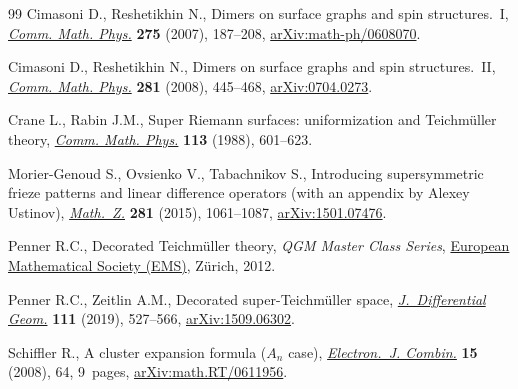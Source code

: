 \documentclass[11pt]{article}
\numberwithin{equation}{section}
\numberwithin{equation}{section}
\begin{document}
\begin{thebibliography}{99}
Cimasoni D., Reshetikhin N., Dimers on surface graphs and spin structures.~{I},
 \href{https://doi.org/10.1007/s00220-007-0302-7}{\textit{Comm. Math. Phys.}} \textbf{275} (2007), 187--208,
 \href{https://arxiv.org/abs/math-ph/0608070}{arXiv:math-ph/0608070}.

Cimasoni D., Reshetikhin N., Dimers on surface graphs and spin
 structures.~{II}, \href{https://doi.org/10.1007/s00220-008-0488-3}{\textit{Comm. Math. Phys.}} \textbf{281} (2008), 445--468,
 \href{https://arxiv.org/abs/0704.0273}{arXiv:0704.0273}.

Crane L., Rabin J.M., Super {R}iemann surfaces: uniformization and
 {T}eichm\"uller theory, \href{https://doi.org/10.1007/BF01223239}{\textit{Comm. Math. Phys.}} \textbf{113} (1988),
 601--623.

Morier-Genoud S., Ovsienko V., Tabachnikov S., Introducing supersymmetric
 frieze patterns and linear difference operators (with an appendix by {A}lexey
 {U}stinov), \href{https://doi.org/10.1007/s00209-015-1520-x}{\textit{Math.~Z.}} \textbf{281} (2015), 1061--1087,
 \href{https://arxiv.org/abs/1501.07476}{arXiv:1501.07476}.

Penner R.C., Decorated {T}eichm\"uller theory, \textit{QGM Master Class Series},
 \href{https://doi.org/10.4171/075}{European Mathematical Society (EMS)}, Z\"urich, 2012.

Penner R.C., Zeitlin A.M., Decorated super-{T}eichm\"uller space,
 \href{https://doi.org/10.4310/jdg/1552442609}{\textit{J.~Differential Geom.}} \textbf{111} (2019), 527--566,
 \href{https://arxiv.org/abs/1509.06302}{arXiv:1509.06302}.

Schiffler R., A cluster expansion formula ({$A_n$} case), \href{https://doi.org/10.37236/788}{\textit{Electron.~J.
 Combin.}} \textbf{15} (2008), 64, 9~pages, \href{https://arxiv.org/abs/math.RT/0611956}{arXiv:math.RT/0611956}.

\end{thebibliography}
\end{document}
